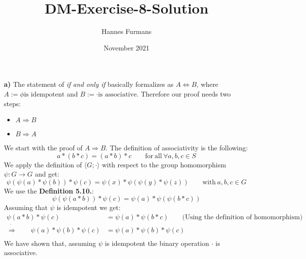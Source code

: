\documentclass{article}
\title{DM-Exercise-8-Solution}
\author{Hannes Furmans }
\date{November 2021}
\begin{document}
\maketitle

\newpage

\textbf{a)} The statement of \textit{if and only if} basically formalizes as $A \iff B$, where $A := \phi \text{is idempotent}$ and $B := \cdot \text{is associative}$. Therefore our proof needs two steps:
\begin{itemize}
    \item $A \Rightarrow B$
    \item $B \Rightarrow A$
\end{itemize}

We start with the proof of $A \Rightarrow B$.
The definition of associativity is the following:
\begin{displaymath}
a * (b*c) = (a*b) *c \qquad \text{for} \: \text{all} \: \forall a,b,c \in S
\end{displaymath}
We apply the definition of $\langle G ; \cdot \rangle$ with respect to the group homomorphism $\psi : G \rightarrow G$ and get:
\begin{displaymath}
\psi (\psi(a) * \psi(b)) * \psi(c) = \psi(x) * \psi(\psi(y) * \psi(z)) \qquad \text{with} \: a,b,c \in G
\end{displaymath}
We use the \textbf{Definition 5.10.}:
\begin{displaymath}
\psi(\psi(a * b)) * \psi(c) = \psi(a) * \psi(\psi(b * c))
\end{displaymath}
Assuming that $\psi$ is idempotent we get:
\begin{align*}
\psi(a*b) * \psi(c) &= \psi(a) * \psi(b * c) \qquad \text{(Using the definition of homomorphism)}\\
\dot\Rightarrow \qquad \psi(a) * \psi(b) * \psi(c) &= \psi(a) * \psi(b) * \psi(c) \\
\end{align*}
We have shown that, assuming $\psi$ is idempotent the binary operation $\cdot$ is associative.
\end{document}
